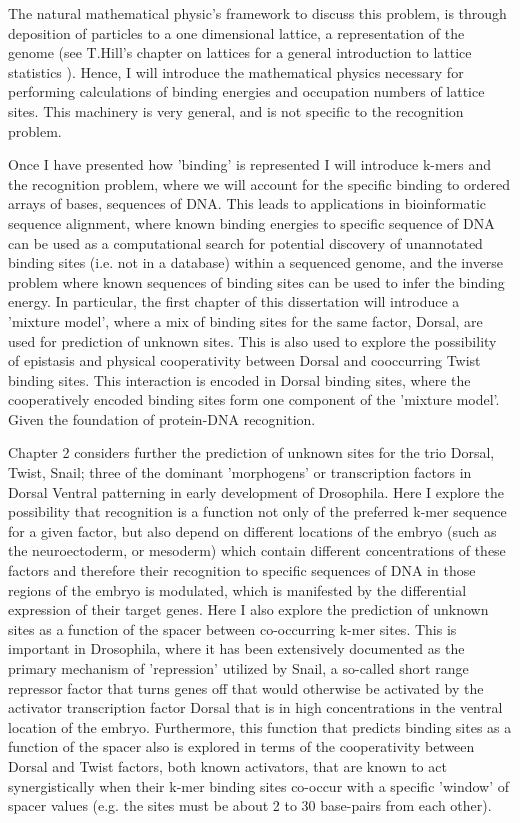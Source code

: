   The natural mathematical physic's framework to discuss this problem, is through deposition of particles to a one dimensional lattice, a representation of the genome (see T.Hill's chapter on lattices for a general introduction to lattice statistics \cite{hill1986introduction}).  Hence, I will introduce the mathematical physics necessary for performing calculations of binding energies and occupation numbers of lattice sites.  This machinery is very general, and is not specific to the recognition problem.  

Once I have presented how 'binding' is represented I will introduce k-mers and the recognition problem, where we will account for the specific binding to ordered arrays of bases, sequences of DNA.  This leads to applications in bioinformatic sequence alignment, where known binding energies to specific sequence of DNA can be used as a computational search for potential discovery of unannotated binding sites (i.e. not in a database) within a sequenced genome, and the inverse problem where known sequences of binding sites can be used to infer the binding energy.  In particular, the first chapter of this dissertation will introduce a 'mixture model', where a mix of binding sites for the same factor, Dorsal, are used for prediction of unknown sites.  This is also used to explore the possibility of epistasis and physical cooperativity between Dorsal and cooccurring Twist binding sites.  This interaction is encoded in Dorsal binding sites, where the cooperatively encoded binding sites form one component of the 'mixture model'.  Given the foundation of protein-DNA recognition.

Chapter 2 considers further the prediction of unknown sites for the trio Dorsal, Twist, Snail; three of the dominant 'morphogens' or transcription factors in Dorsal Ventral patterning in early development of Drosophila.  Here I explore the possibility that recognition is a function not only of the preferred k-mer sequence for a given factor, but also depend on different locations of the embryo (such as the neuroectoderm, or mesoderm) which contain different concentrations of these factors and therefore their recognition to specific sequences of DNA in those regions of the embryo is modulated, which is manifested by the differential expression of their target genes.  Here I also explore the prediction of unknown sites as a function of the spacer between co-occurring k-mer sites.  This is important in Drosophila, where it has been extensively documented as the primary mechanism of 'repression' utilized by Snail, a so-called short range repressor factor that turns genes off that would otherwise be activated by the activator transcription factor Dorsal that is in high concentrations in the ventral location of the embryo.  Furthermore, this function that predicts binding sites as a function of the spacer also is explored in terms of the cooperativity between Dorsal and Twist factors, both known activators, that are known to act synergistically when their k-mer binding sites co-occur with a specific 'window' of spacer values (e.g. the sites must be about 2 to 30 base-pairs from each other).   

